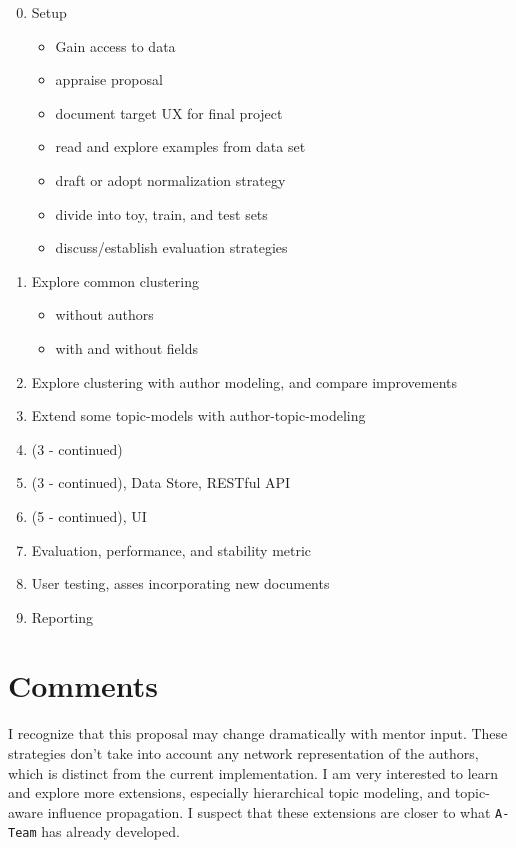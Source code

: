 \documentclass{article}
\begin{document}
\begin{multicols}{2}
\begin{enumerate}[\texttt{WK} 1 -]
  \setcounter{enumi}{-1}
\item Setup
  \begin{itemize}
  \item Gain access to data
  \item appraise proposal
  \item document target UX for final project
  \item read and explore examples from data set
  \item draft or adopt normalization strategy
  \item divide into toy, train, and test sets
  \item discuss/establish evaluation strategies
  \end{itemize}
\item Explore common clustering
  \begin{itemize}
  \item without authors
  \item with and without fields
  \end{itemize}
\item Explore clustering with author modeling, and compare improvements
\item Extend some topic-models with author-topic-modeling
\item (3 - continued)
\item (3 - continued), Data Store, RESTful API
\item (5 - continued), UI
\item Evaluation, performance, and stability metric
\item User testing, asses incorporating new documents
\item Reporting
\end{enumerate}

\section{Comments}

I recognize that this proposal may change dramatically with mentor input.
These strategies don't take into account any network representation of the authors,
which is distinct from the current implementation.
I am very interested to learn and explore more extensions, especially hierarchical
topic modeling, and topic-aware influence propagation. I suspect that these
extensions are closer to what \texttt{A-Team} has already developed.



\end{multicols}
\end{document}
